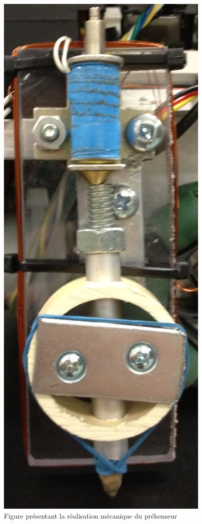 \begin{figure}[htbp]
\centering
\includegraphics[scale=0.5]{fig/prehenseur2.jpg}
\caption{Figure présentant la réalisation mécanique du préhenseur}
\label{fig:prehenseur2}
\end{figure}

